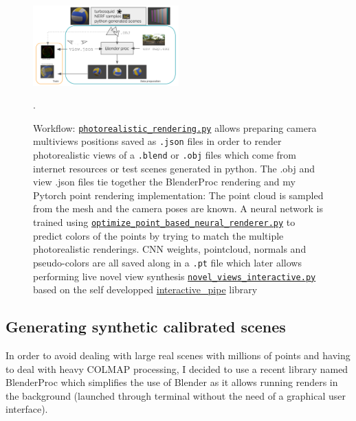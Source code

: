 \begin{figure}[H]
    \centering
    \includegraphics[width=0.5\textwidth]{figures/data_prep_and_training.png}
    \caption{Workflow: \href{https://github.com/balthazarneveu/per-pixel-point-rendering/blob/main/studies/photorealistic\_rendering.py}{\texttt{photorealistic\_rendering.py}} allows preparing camera multiviews positions saved as \texttt{.json} files in order to render photorealistic views of a \texttt{.blend} or  \texttt{.obj} files which come from internet resources or test scenes generated in python.
    The .obj and view .json files tie together the BlenderProc rendering and my Pytorch point rendering implementation: The point cloud is sampled from the mesh and the camera poses are known. A neural network is trained using \href{https://github.com/balthazarneveu/per-pixel-point-rendering/blob/main/scripts/optimize\_point\_based\_neural\_renderer.py}{\texttt{optimize\_point\_based\_neural\_renderer.py}} to predict colors of the points by trying to match the multiple photorealistic renderings. CNN weights, pointcloud, normals and pseudo-colors are all saved along in a \texttt{.pt} file which later allows performing live novel view synthesis \href{https://github.com/balthazarneveu/per-pixel-point-rendering/blob/main/scripts/novel\_views\_interactive.py}{\texttt{novel\_views\_interactive.py}} based on the self developped \href{https://github.com/balthazarneveu/interactive\_pipe}{interactive\_pipe} library}.
    \label{fig:data_and_train}
\end{figure}


\subsection{Generating synthetic calibrated scenes}
\label{sec:synthetic_calibrated_scenes}
In order to avoid dealing with large real scenes with millions of points and having to deal with heavy COLMAP processing, I decided to use a recent library named BlenderProc  \cite{Denninger2023} which simplifies the use of Blender as it allows running renders in the background (launched through terminal without the need of a graphical user interface).

